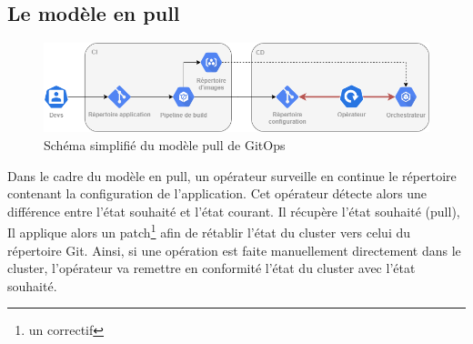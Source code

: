 \documentclass[11pt,fleqn]{book} %
\begin{document}
\subsection{Le modèle en pull}
\begin{figure}[H]
\renewcommand{\figurename}{Schéma}
\hspace{-1cm}
\includegraphics[scale=0.6]{Pictures/CI-CD/pull-model.png}
\captionsetup{margin=1.5cm,format=hang,justification=justified}
\caption[]{Schéma simplifié du modèle pull de GitOps \newline}
\end{figure}

Dans le cadre du modèle en pull, un opérateur surveille en continue le répertoire contenant la configuration de l'application. Cet opérateur détecte alors une différence entre l'état souhaité et l'état courant. Il récupère l'état souhaité (pull), Il applique alors un patch\footnote{un correctif} afin de rétablir l'état du cluster vers celui du répertoire Git. Ainsi, si une opération est faite manuellement directement dans le cluster, l'opérateur va remettre en conformité l'état du cluster avec l'état souhaité.
\end{document}
